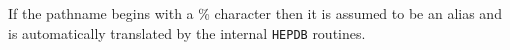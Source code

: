 If the pathname begins with a \% character then it is assumed to be
an alias and is automatically translated by the internal {\tt HEPDB}
routines.

